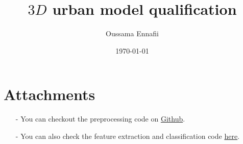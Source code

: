 \documentclass[a4paper, 11pt]{article}
\title{$3D$ urban model qualification}
\author{Oussama Ennafii}
\date{\today}
\begin{document}
	\maketitle

	

	

	

	

	\section*{Attachments}
	\begin{itemize}
		\item[-] You can checkout the preprocessing code on
		\href{https://github.com/ethiy/proj.city}{Github}.
		\item[-] You can also check the feature extraction and classification code
		\href{https://github.com/ethiy/qualcity}{here}.
	\end{itemize}

	
	
\end{document}

